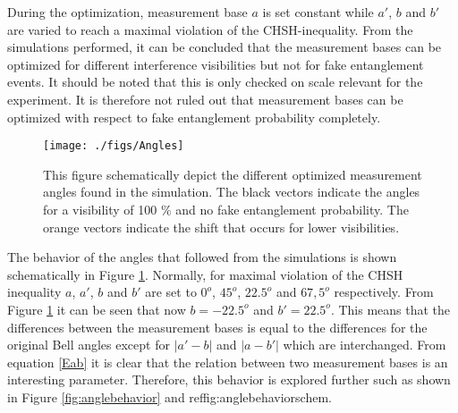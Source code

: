 During the optimization, measurement base $a$ is set constant while $a'$, $b$ and $b'$ are varied to reach a maximal violation of the CHSH-inequality. From the simulations performed,  it can be concluded that the measurement bases can be optimized for different interference visibilities but not for fake entanglement events. It should be noted that this is only checked on scale relevant for the experiment. It is therefore not ruled out that measurement bases can be optimized with respect to fake entanglement probability completely. 

\begin{figure}[h!]\centering
\texttt{[image: ./figs/Angles]}
\caption{This figure schematically depict the different optimized measurement angles found in the simulation. The black vectors indicate the angles for a visibility of 100 \% and no fake entanglement probability. The orange vectors indicate the shift that occurs for lower visibilities.}
\label{fig:anglebehaviorschem}
\end{figure}

The behavior of the angles that followed from the simulations is shown schematically in Figure \ref{fig:anglebehaviorschem}. Normally, for maximal violation of the CHSH inequality $a$, $a'$, $b$ and $b'$ are set to $0^o$, $45^o$, $22.5^o$ and $67,5^o$ respectively. From Figure \ref{fig:anglebehaviorschem} it can be seen that now $b = -22.5^o$ and $b' = 22.5^o$. This means that the differences between the measurement bases is equal to the differences for the original Bell angles except for $\left|a'-b\right|$ and $\left|a-b'\right|$ which are interchanged. From equation \ref{Eab} it is clear that the relation between two measurement bases is an interesting parameter. Therefore, this behavior is explored further such as shown in Figure \ref{fig:anglebehavior} and ref{fig:anglebehaviorschem}. 


